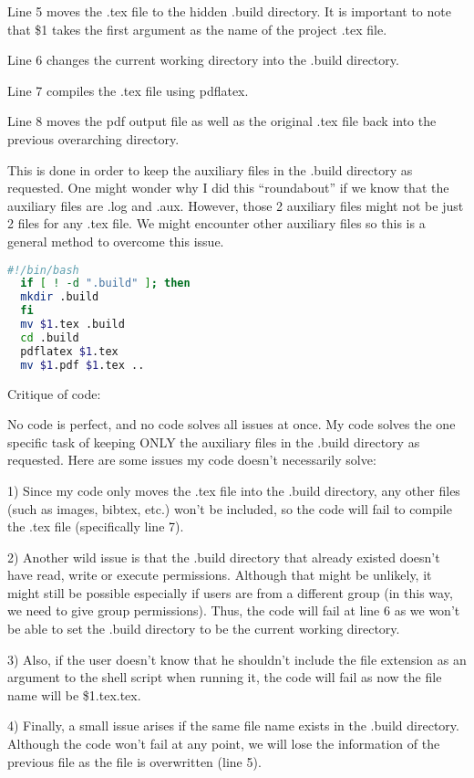 \documentclass{article}
\begin{document}
Line 5 moves the .tex file to the hidden .build directory. It is important to note that \$1 takes the first argument as the name of the project .tex file.

Line 6 changes the current working directory into the .build directory.

Line 7 compiles the .tex file using pdflatex.

Line 8 moves the pdf output file as well as the original .tex file back into the previous overarching directory.

This is done in order to keep the auxiliary files in the .build directory as requested. One might wonder why I did this ``roundabout'' if we know that the auxiliary files are .log and .aux. However, those 2 auxiliary files might not be just 2 files for any .tex file. We might encounter other auxiliary files so this is a general method to overcome this issue.

\begin{lstlisting}[language=bash, basicstyle=\ttfamily, caption={Shell script of Part 1}]
  #!/bin/bash
  if [ ! -d ".build" ]; then
  mkdir .build
  fi
  mv $1.tex .build
  cd .build
  pdflatex $1.tex
  mv $1.pdf $1.tex ..
\end{lstlisting}

Critique of code:

No code is perfect, and no code solves all issues at once. My code solves the one specific task of keeping ONLY the auxiliary files in the .build directory as requested. Here are some issues my code doesn't necessarily solve:

1) Since my code only moves the .tex file into the .build directory, any other files (such as images, bibtex, etc.) won't be included, so the code will fail to compile the .tex file (specifically line 7).

2) Another wild issue is that the .build directory that already existed doesn't have read, write or execute permissions. Although that might be unlikely, it might still be possible especially if users are from a different group (in this way, we need to give group permissions). Thus, the code will fail at line 6 as we won't be able to set the .build directory to be the current working directory.

3) Also, if the user doesn't know that he shouldn't include the file extension as an argument to the shell script when running it, the code will fail as now the file name will be \$1.tex.tex.

4) Finally, a small issue arises if the same file name exists in the .build directory. Although the code won't fail at any point, we will lose the information of the previous file as the file is overwritten (line 5).
\end{document}
